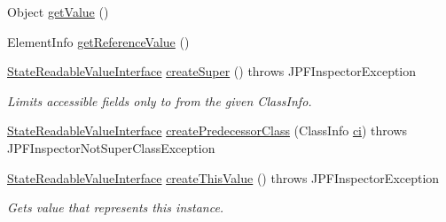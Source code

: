 \begin{DoxyCompactItemize}
Object \hyperlink{interfacegov_1_1nasa_1_1jpf_1_1inspector_1_1server_1_1programstate_1_1_state_readable_value_interface_a6bb9486c6b7de18915680f234d56d4d5}{get\+Value} ()
\item 
Element\+Info \hyperlink{interfacegov_1_1nasa_1_1jpf_1_1inspector_1_1server_1_1programstate_1_1_state_readable_value_interface_ad56cb49db2120680a8ebffcc46d77871}{get\+Reference\+Value} ()
\item 
\hyperlink{interfacegov_1_1nasa_1_1jpf_1_1inspector_1_1server_1_1programstate_1_1_state_readable_value_interface}{State\+Readable\+Value\+Interface} \hyperlink{interfacegov_1_1nasa_1_1jpf_1_1inspector_1_1server_1_1programstate_1_1_state_readable_value_interface_a299f20e9db1151e4fdbe870583743799}{create\+Super} ()  throws J\+P\+F\+Inspector\+Exception
\begin{DoxyCompactList}\small\item\em Limits accessible fields only to from the given Class\+Info. \end{DoxyCompactList}\item 
\hyperlink{interfacegov_1_1nasa_1_1jpf_1_1inspector_1_1server_1_1programstate_1_1_state_readable_value_interface}{State\+Readable\+Value\+Interface} \hyperlink{interfacegov_1_1nasa_1_1jpf_1_1inspector_1_1server_1_1programstate_1_1_state_readable_value_interface_ae4e9a3d10684db8bdba8bf221c83e8fe}{create\+Predecessor\+Class} (Class\+Info \hyperlink{classgov_1_1nasa_1_1jpf_1_1inspector_1_1server_1_1programstate_1_1_state_value_a0eb4aa1e630ed6372dcfb8c41ae7edc5}{ci})  throws J\+P\+F\+Inspector\+Not\+Super\+Class\+Exception
\item 
\hyperlink{interfacegov_1_1nasa_1_1jpf_1_1inspector_1_1server_1_1programstate_1_1_state_readable_value_interface}{State\+Readable\+Value\+Interface} \hyperlink{interfacegov_1_1nasa_1_1jpf_1_1inspector_1_1server_1_1programstate_1_1_state_readable_value_interface_a726b9bd70d7e76da89660f6a614d7fe1}{create\+This\+Value} ()  throws J\+P\+F\+Inspector\+Exception
\begin{DoxyCompactList}\small\item\em Gets value that represents this instance. \end{DoxyCompactList}\end{DoxyCompactItemize}
